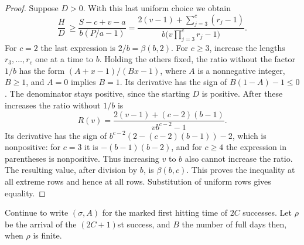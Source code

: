 \documentclass[11pt]{article}
\begin{document}
\begin{proof}
Suppose $D>0$. With this last uniform choice we obtain
\[
 \frac HD\ \geq
 \frac{S-c+v-a}{b(P/a-1)}
 =\frac{2(v-1)+\sum_{j=3}^c(r_j-1)}
        {b\bigl(v\prod_{j=3}^c r_j-1\bigr)}.
\]
For $c=2$ the last expression is $2/b=\beta(b,2)$.
For $c\geq3$, increase the lengths $r_3,\ldots,r_c$ one at a time
to $b$. Holding the others fixed, the ratio without the factor $1/b$
has the form $(A+x-1)/(Bx-1)$, where $A$ is a nonnegative integer,
$B\geq1$, and $A=0$ implies $B=1$.
Its derivative has the sign of $B(1-A)-1\leq0$.
The denominator stays positive, since the starting $D$ is positive.
After these increases the ratio without $1/b$ is
\[
 R(v)=\frac{2(v-1)+(c-2)(b-1)}{v b^{c-2}-1}.
\]
Its derivative has the sign of
$b^{c-2}(2-(c-2)(b-1))-2$, which is nonpositive:
for $c=3$ it is $-(b-1)(b-2)$, and for $c\geq4$ the expression
in parentheses is nonpositive. Thus increasing $v$ to $b$ also
cannot increase the ratio. The resulting value, after division by $b$,
is $\beta(b,c)$. This proves the inequality at all extreme rows and
hence at all rows. Substitution of uniform rows gives equality.
\end{proof}

Continue to write $(\sigma,A)$ for the marked first hitting time of
$2C$ successes. Let $\rho$ be the arrival of the $(2C+1)$st success,
and $B$ the number of full days then, when $\rho$ is finite.
\end{document}
